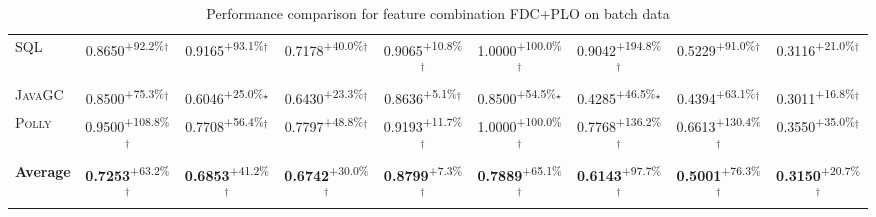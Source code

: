 \begin{table}[htbp]
\begin{tabular}{l|cccc|cccc}
\textsc{SQL} & \cellcolor{green!30}0.8650\textsuperscript{+92.2\%}$^\dagger$ & \cellcolor{green!30}0.9165\textsuperscript{+93.1\%}$^\dagger$ & \cellcolor{green!30}0.7178\textsuperscript{+40.0\%}$^\dagger$ & \cellcolor{green!30}0.9065\textsuperscript{+10.8\%}$^\dagger$ & \cellcolor{green!30}1.0000\textsuperscript{+100.0\%}$^\dagger$ & \cellcolor{green!30}0.9042\textsuperscript{+194.8\%}$^\dagger$ & \cellcolor{green!30}0.5229\textsuperscript{+91.0\%}$^\dagger$ & \cellcolor{green!30}0.3116\textsuperscript{+21.0\%}$^\dagger$ \\
\textsc{JavaGC} & \cellcolor{green!30}0.8500\textsuperscript{+75.3\%}$^\dagger$ & \cellcolor{green!30}0.6046\textsuperscript{+25.0\%}$^\star$ & \cellcolor{green!30}0.6430\textsuperscript{+23.3\%}$^\dagger$ & \cellcolor{green!30}0.8636\textsuperscript{+5.1\%}$^\dagger$ & \cellcolor{green!30}0.8500\textsuperscript{+54.5\%}$^\star$ & \cellcolor{green!30}0.4285\textsuperscript{+46.5\%}$^\star$ & \cellcolor{green!30}0.4394\textsuperscript{+63.1\%}$^\dagger$ & \cellcolor{green!30}0.3011\textsuperscript{+16.8\%}$^\dagger$ \\
\textsc{Polly} & \cellcolor{green!30}0.9500\textsuperscript{+108.8\%}$^\dagger$ & \cellcolor{green!30}0.7708\textsuperscript{+56.4\%}$^\dagger$ & \cellcolor{green!30}0.7797\textsuperscript{+48.8\%}$^\dagger$ & \cellcolor{green!30}0.9193\textsuperscript{+11.7\%}$^\dagger$ & \cellcolor{green!30}1.0000\textsuperscript{+100.0\%}$^\dagger$ & \cellcolor{green!30}0.7768\textsuperscript{+136.2\%}$^\dagger$ & \cellcolor{green!30}0.6613\textsuperscript{+130.4\%}$^\dagger$ & \cellcolor{green!30}0.3550\textsuperscript{+35.0\%}$^\dagger$ \\
\hline
\textbf{Average} & \cellcolor{green!30}\textbf{0.7253}\textsuperscript{+63.2\%}$^\dagger$ & \cellcolor{green!30}\textbf{0.6853}\textsuperscript{+41.2\%}$^\dagger$ & \cellcolor{green!30}\textbf{0.6742}\textsuperscript{+30.0\%}$^\dagger$ & \cellcolor{green!30}\textbf{0.8799}\textsuperscript{+7.3\%}$^\dagger$ & \cellcolor{green!30}\textbf{0.7889}\textsuperscript{+65.1\%}$^\dagger$ & \cellcolor{green!30}\textbf{0.6143}\textsuperscript{+97.7\%}$^\dagger$ & \cellcolor{green!30}\textbf{0.5001}\textsuperscript{+76.3\%}$^\dagger$ & \cellcolor{green!30}\textbf{0.3150}\textsuperscript{+20.7\%}$^\dagger$ \\
\hline
\end{tabular}
\caption{Performance comparison for feature combination FDC+PLO on batch data}
\label{tab:combo_FDC_PLO_performance_batch}
\end{table}